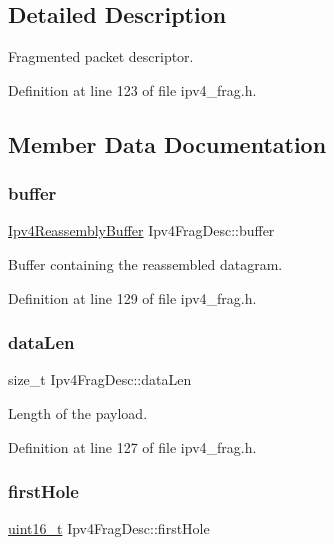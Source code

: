 \subsection{Detailed Description}
Fragmented packet descriptor. 

Definition at line 123 of file ipv4\+\_\+frag.\+h.



\subsection{Member Data Documentation}
\mbox{\label{structIpv4FragDesc_a348be10f5e00d0cf9bcb1b18c5c367cb}} 
\subsubsection{\texorpdfstring{buffer}{buffer}}
{\footnotesize\ttfamily \hyperlink{structIpv4ReassemblyBuffer}{Ipv4\+Reassembly\+Buffer} Ipv4\+Frag\+Desc\+::buffer}



Buffer containing the reassembled datagram. 



Definition at line 129 of file ipv4\+\_\+frag.\+h.

\mbox{\label{structIpv4FragDesc_ae0496f42fdecf5ead0db14b0eca0419d}} 
\subsubsection{\texorpdfstring{data\+Len}{dataLen}}
{\footnotesize\ttfamily size\+\_\+t Ipv4\+Frag\+Desc\+::data\+Len}



Length of the payload. 



Definition at line 127 of file ipv4\+\_\+frag.\+h.

\mbox{\label{structIpv4FragDesc_aecd2b578651ed97157db0013466e4e33}} 
\subsubsection{\texorpdfstring{first\+Hole}{firstHole}}
{\footnotesize\ttfamily \hyperlink{stdint_8h_a273cf69d639a59973b6019625df33e30}{uint16\+\_\+t} Ipv4\+Frag\+Desc\+::first\+Hole}



